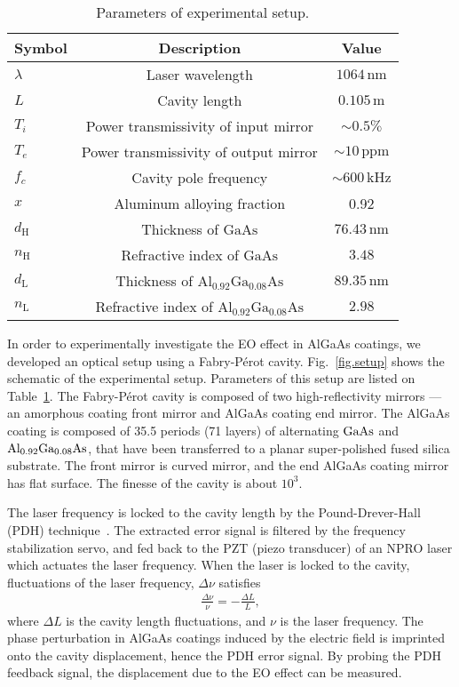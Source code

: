 \begin{table}[h!]
    \caption{Parameters of experimental setup.}\label{tab.param}
\centering 
\begin{tabular}{lcc}
    \hline \hline
    Symbol & Description & Value \\
    \hline
    $\lambda$ & Laser wavelength & $1064 \, \mathrm{nm}$ \\
    $L$ & Cavity length & $0.105\, \mathrm{m}$ \\
    $T_i$ & Power transmissivity of input mirror & $\sim0.5\%$ \\
    $T_e$ & Power transmissivity of output mirror & $\sim10\, \mathrm{ppm}$ \\
    $f_c$ & Cavity pole frequency & $\sim600\, \mathrm{kHz}$ \\
    $x$ & Aluminum alloying fraction & 0.92 \\
    $d_{\mathrm{H}}$ & Thickness of $\mathrm{GaAs}$ & $76.43\, \mathrm{nm}$ \\
    $n_{\mathrm{H}}$ & Refractive index of $\mathrm{GaAs}$ & $3.48$ \\
    $d_{\mathrm{L}}$ & Thickness of $\mathrm{Al_{0.92}Ga_{0.08}As}$ & $89.35\, \mathrm{nm}$ \\
    $n_{\mathrm{L}}$ & Refractive index of $\mathrm{Al_{0.92}Ga_{0.08}As}$ & $2.98$ \\
    \hline \hline
\end{tabular}
\end{table}

In order to experimentally investigate the EO effect in AlGaAs coatings, we developed an optical setup using a Fabry-P\'erot cavity.
Fig.~\ref{fig.setup} shows the schematic of the experimental setup.
Parameters of this setup are listed on Table~\ref{tab.param}.
The Fabry-P\'erot cavity is composed of two high-reflectivity mirrors --- an amorphous coating front mirror and AlGaAs coating end mirror.
The AlGaAs coating is composed of 35.5 periods (71 layers) of alternating $\mathrm{GaAs}$ and $\mathrm{Al_{0.92}Ga_{0.08}As}$, that have been transferred to a planar super-polished fused silica substrate.
The front mirror is curved mirror, and the end AlGaAs coating mirror has flat surface.
The finesse of the cavity is about $10^3$.

The laser frequency is locked to the cavity length by the Pound-Drever-Hall (PDH) technique~\cite{PDH}.
The extracted error signal is filtered by the frequency stabilization servo, and fed back to the PZT (piezo transducer) of an NPRO laser which actuates the laser frequency.
When the laser is locked to the cavity, fluctuations of the laser frequency, $\Delta\nu$ satisfies
\begin{align}
    \frac{\Delta \nu}{\nu} = -\frac{\Delta L}{L},
    \label{eq.cavity_fluctuation}
\end{align}
where $\Delta L$ is the cavity length fluctuations, and $\nu$ is the laser frequency.
The phase perturbation in AlGaAs coatings induced by the electric field is imprinted onto the cavity displacement, hence the PDH error signal.
By probing the PDH feedback signal, the displacement due to the EO effect can be measured.


